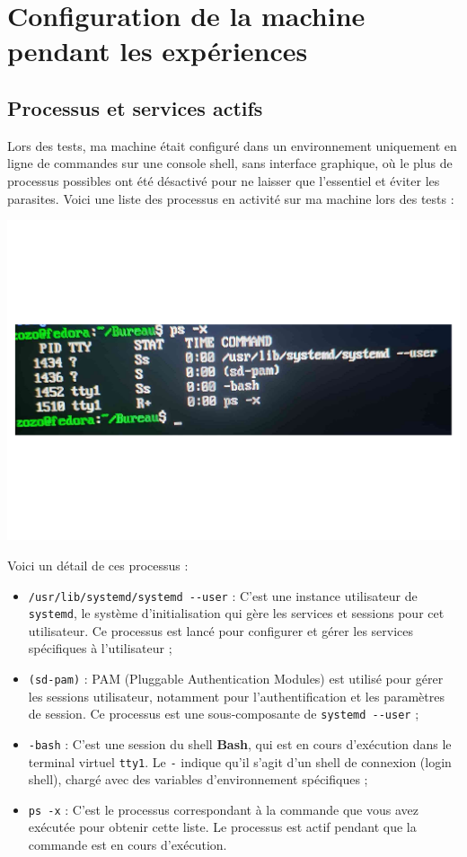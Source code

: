 \documentclass{rapport}
\begin{document}
    \section{Configuration de la machine pendant les expériences} 
      
      \subsection{Processus et services actifs}
        Lors des tests, ma machine était configuré dans un environnement uniquement en ligne de commandes sur une console shell, sans interface graphique, où le plus de processus possibles ont été désactivé pour ne laisser que l'essentiel et éviter les parasites.
        Voici une liste des processus en activité sur ma machine lors des tests :

        \includegraphics[width=15cm]{img/processus_actifs.pdf}

        Voici un détail de ces processus :
        
        \begin{itemize}
            \item \verb:/usr/lib/systemd/systemd --user: : C'est une instance utilisateur de \verb:systemd:, le système d'initialisation qui gère les services et sessions pour cet utilisateur. Ce processus est lancé pour configurer et gérer les services spécifiques à l'utilisateur ;
            \item \verb:(sd-pam): : PAM (Pluggable Authentication Modules) est utilisé pour gérer les sessions utilisateur, notamment pour l'authentification et les paramètres de session. Ce processus est une sous-composante de \verb:systemd --user: ;
            \item \verb:-bash: : C'est une session du shell \textbf{Bash}, qui est en cours d'exécution dans le terminal virtuel \verb:tty1:. Le \verb:-: indique qu'il s'agit d'un shell de connexion (login shell), chargé avec des variables d'environnement spécifiques ;
            \item \verb:ps -x: : C'est le processus correspondant à la commande que vous avez exécutée pour obtenir cette liste. Le processus est actif pendant que la commande est en cours d'exécution.
        \end{itemize}
      
\end{document}

